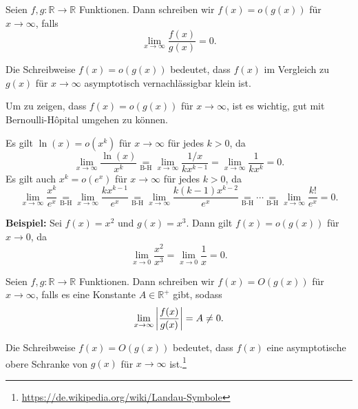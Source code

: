 \documentclass[12pt]{article}
\newcommand{\BH}{\underset{\textrm{B-H}}{=}}
\newcommand{\R}{\mathbb{R}} %
\newenvironment{definition}[2][Definition]{\begin{trivlist}
        \item[\hskip \labelsep {\bfseries #1}\hskip \labelsep {\bfseries #2.}]}{\flushright{$\square$}\end{trivlist}}
\newenvironment{remark}[2][Bemerkung]{\begin{trivlist}
        \item[\hskip \labelsep {\bfseries #1}\hskip \labelsep {\bfseries #2.}]}{\end{trivlist}}
\begin{document}
\begin{definition}{[Landau-o]}
        Seien $f,g: \R\to\R$ Funktionen. Dann schreiben wir $f(x)=o(g(x))$ für $x\to \infty$, falls
        \begin{equation}
                \lim_{x\to \infty}\frac{f(x)}{g(x)}=0.
        \end{equation}

        \begin{remark}{[Intuition]}
                Die Schreibweise $f(x)=o(g(x))$ bedeutet, dass $f(x)$ im Vergleich zu $g(x)$ für $x\to \infty$ asymptotisch vernachlässigbar klein ist.
        \end{remark}
        \begin{remark}{[Berechnung]}
                Um zu zeigen, dass $f(x)=o(g(x))$ für $x\to \infty$, ist es wichtig, gut mit Bernoulli-Hôpital umgehen zu können.
        \end{remark}
        \begin{remark}{[$\ln$, $x^k$ und $e^x$]}
                Es gilt $\ln(x)=o(x^k)$ für $x\to\infty$ für jedes $k>0$, da
                \begin{equation}
                        \lim_{x\to\infty}\frac{\ln(x)}{x^k}\BH{}\lim_{x\to\infty}\frac{1/x}{kx^{k-1}}=\lim_{x\to\infty}\frac{1}{kx^k}=0.
                \end{equation}
                Es gilt auch $x^k=o(e^x)$ für $x\to\infty$ für jedes $k>0$, da
                \begin{equation}
                        \lim_{x\to\infty}\frac{x^k}{e^x}\BH{}\lim_{x\to\infty}\frac{kx^{k-1}}{e^x}\BH\lim_{x\to\infty}\frac{k(k-1)x^{k-2}}{e^x}\BH\cdots\BH\lim_{x\to\infty}\frac{k!}{e^x}=0.
                \end{equation}
        \end{remark}
        \textbf{Beispiel:} Sei $f(x)=x^2$ und $g(x)=x^3$. Dann gilt $f(x)=o(g(x))$ für $x\to 0$, da
        \begin{equation}
                \lim_{x\to 0}\frac{x^2}{x^3}=\lim_{x\to 0}\frac{1}{x}=0.
        \end{equation}
\end{definition}

\begin{definition}{[Landau-O]}
        Seien $f,g: \R\to\R$ Funktionen. Dann schreiben wir $f(x)=O(g(x))$ für $x\to \infty$, falls es eine Konstante $A\in\R^{+}$ gibt, sodass
        \begin{equation}
                \lim_{x\to \infty}\abs{\frac{f(x)}{g(x)}}=A\neq0.
        \end{equation}

        \begin{remark}{[Intuition]}
                Die Schreibweise $f(x)=O(g(x))$ bedeutet, dass $f(x)$ eine asymptotische obere Schranke von $g(x)$ für $x\to \infty$ ist.\footnote{\url{https://de.wikipedia.org/wiki/Landau-Symbole}}
        \end{remark}
\end{definition}
\end{document}
